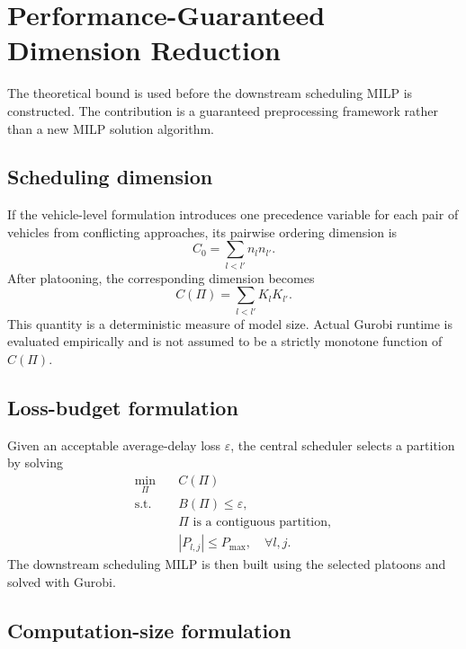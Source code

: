 \section{Performance-Guaranteed Dimension Reduction}
\label{sec:dimension-reduction}

The theoretical bound is used before the downstream scheduling MILP is constructed. The contribution is a guaranteed preprocessing framework rather than a new MILP solution algorithm.

\subsection{Scheduling dimension}

If the vehicle-level formulation introduces one precedence variable for each pair of vehicles from conflicting approaches, its pairwise ordering dimension is
\begin{equation}
C_0=\sum_{l<l'}n_ln_{l'}.
\end{equation}
After platooning, the corresponding dimension becomes
\begin{equation}
C(\Pi)=\sum_{l<l'}K_lK_{l'}.
\label{eq:dimension-measure}
\end{equation}
This quantity is a deterministic measure of model size. Actual Gurobi runtime is evaluated empirically and is not assumed to be a strictly monotone function of \(C(\Pi)\).

\subsection{Loss-budget formulation}

Given an acceptable average-delay loss \(\varepsilon\), the central scheduler selects a partition by solving
\begin{align}
\min_{\Pi}\quad & C(\Pi)\\
\text{s.t.}\quad & B(\Pi)\le\varepsilon,\\
& \Pi\text{ is a contiguous partition},\\
& |P_{l,j}|\le P_{\max},\quad \forall l,j.
\label{eq:loss-budget-formulation}
\end{align}
The downstream scheduling MILP is then built using the selected platoons and solved with Gurobi.

\subsection{Computation-size formulation}

